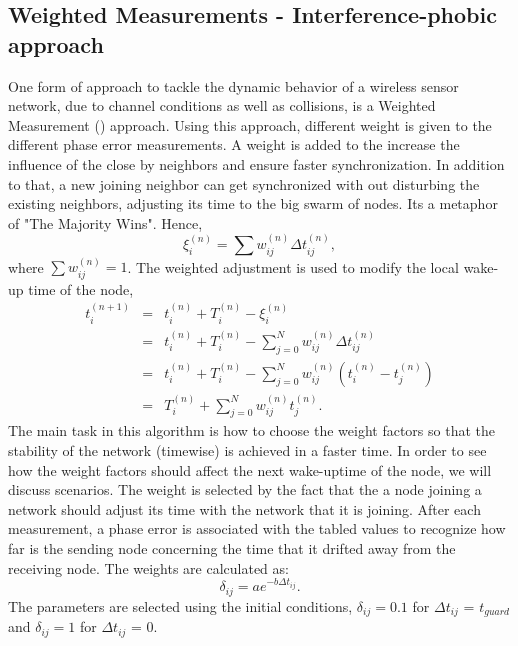 \documentclass[a4paper,10pt]{report}
\begin{document}
\subsection{\textbf{Weighted Measurements - Interference-phobic approach}}
One form of approach to tackle the dynamic behavior of a wireless sensor network, due to channel conditions as well as collisions, is a
Weighted Measurement () approach. Using this approach, different weight is given to the different phase error measurements. A weight is added to the increase the influence of the close by neighbors and ensure faster synchronization. In addition to that, a new joining neighbor can get synchronized with out disturbing the existing neighbors, adjusting its time to the big swarm of nodes. Its a metaphor of "The Majority Wins". Hence,
\begin{equation}
\xi_i^{(n)} = \sum{w_{ij}^{(n)}\Delta t_{ij}^{(n)}} ,
\end{equation}
where $\sum{w_{ij}^{(n)}= 1}$.
\newline
The weighted adjustment is used to modify the local wake-up time of the node,
\begin{eqnarray*}
t_i^{(n+1)} &=& t_i^{(n)} + T_i^{(n)} - \xi_i^{(n)} \\ &=& t_i^{(n)}
+ T_i^{(n)} - \sum_{j=0}^N{w_{ij}^{(n)}\Delta t_{ij}^{(n)}} \\ &=&
t_i^{(n)}+ T_i^{(n)} -
\sum_{j=0}^N{w_{ij}^{(n)}(t_i^{(n)}-t_j^{(n)})} \\ &=& T_i^{(n)} + \sum_{j=0}^N{w_{ij}^{(n)}t_j^{(n)}}.
\end{eqnarray*}
\newline
The main task in this algorithm is how to choose the weight factors so that the stability of the network (timewise) is achieved in a faster time. In order to see how the weight factors should affect the next wake-uptime of the node, we will discuss scenarios.
\newline
The weight is selected by the fact that the a node joining a network should adjust its time with the network that it is joining. After
each measurement, a phase error is associated with the tabled values to recognize how far is the sending node concerning the time that it
drifted away from the receiving node. The weights are calculated as:
\begin{equation}
\delta_{ij} = ae^{-b\Delta t_{ij}}.
\end{equation}
The parameters are selected using the initial conditions, $\delta_{ij}=0.1$ for $\Delta t_{ij}$ = $t_{guard}$ and $\delta_{ij}=1$ for $\Delta t_{ij}$ = 0.
\end{document}
